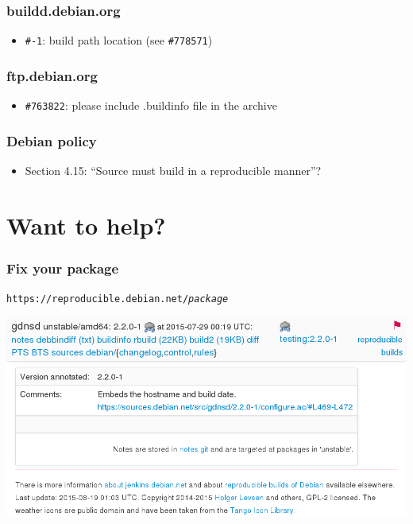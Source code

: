 \documentclass[14pt,aspectratio=169]{beamer}
\begin{document}
\begin{frame}
 \frametitle{buildd.debian.org}

 \begin{itemize}\small
  \item \texttt{\#-1}: build path location (see \texttt{\#778571})
 \end{itemize}
\end{frame}

\begin{frame}
 \frametitle{ftp.debian.org}

 \begin{itemize}\small
  \item \texttt{\#763822}: please include .buildinfo file in the archive
 \end{itemize}
\end{frame}


\begin{frame}
 \frametitle{Debian policy}

 \begin{itemize}
  \item Section 4.15: “Source must build in a reproducible manner”? 
 \end{itemize}
\end{frame}

\section{Want to help?}

\begin{frame}
 \frametitle{Fix your package}

 \begin{center}
  \texttt{https://reproducible.debian.net/\textit{package}}

  \includegraphics[width=\linewidth]{images/rdn-gdnsd.png}
 \end{center}
\end{frame}
\end{document}
